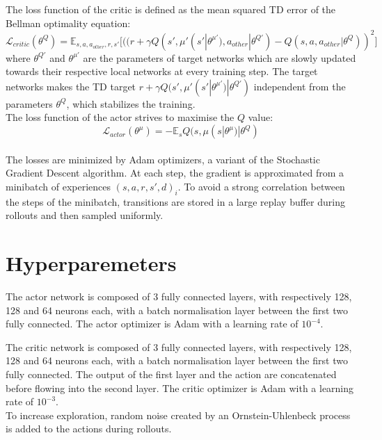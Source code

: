 \documentclass{article}
\begin{document}
    The loss function of the critic is defined as the mean squared TD error of the Bellman optimality equation:
    \[
        \mathcal{L}_{critic}(\theta^Q) = \mathbb{E}_{s, a, a_{other}, r, s'} \big[((r + \gamma Q(s', \mu'(s'| \theta^{\mu'}), a_{other}| \theta^{Q'}) - Q(s, a, a_{other}| \theta^Q))^2\big]
    \]
    where $\theta^{Q'}$ and $\theta^{\mu'}$ are the parameters of target networks which are slowly updated towards their respective local networks at every training step.
    The target networks makes the TD target $r + \gamma Q(s', \mu'(s'| \theta^{\mu'})| \theta^{Q'})$ independent from the parameters $\theta^Q$,
    which stabilizes the training.\\

    The loss function of the actor strives to maximise the $Q$ value:
    \[
        \mathcal{L}_{actor}(\theta^{\mu}) = - \mathbb{E}_{s} Q(s, \mu(s | \theta^\mu) | \theta^Q)
    \]\\

    The losses are minimized by Adam optimizers, a variant of the Stochastic Gradient Descent algorithm.
    At each step, the gradient is approximated from a minibatch of experiences ${(s, a, r, s', d)_i}$.
    To avoid a strong correlation between the steps of the minibatch, transitions are stored in a large replay buffer
    during rollouts and then sampled uniformly.


    \section{Hyperparemeters}\label{sec:hyperparemeters}

    The actor network is composed of 3 fully connected layers, with respectively 128, 128 and 64 neurons each,
    with a batch normalisation layer between the first two fully connected.
    The actor optimizer is Adam with a learning rate of $10^{-4}$.

    The critic network is composed of 3 fully connected layers, with respectively 128, 128 and 64 neurons each,
    with a batch normalisation layer between the first two fully connected.
    The output of the first layer and the action are concatenated before flowing into the second layer.
    The critic optimizer is Adam with a learning rate of $10^{-3}$.\\

    To increase exploration, random noise created by an Ornstein-Uhlenbeck process is added to the actions during rollouts.\\
\end{document}
